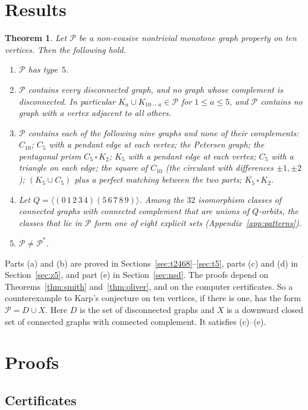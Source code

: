 \documentclass[11pt]{article}
\theoremstyle{plain}
\newtheorem{theorem}{Theorem}[section]
\theoremstyle{definition}
\theoremstyle{remark}
\newcommand{\PP}{\mathcal P}
\begin{document}
\section{Results}

\begin{theorem}\label{thm:main}
Let $\PP$ be a non-evasive nontrivial monotone graph property on ten vertices.
Then the following hold.
\begin{enumerate}[label=(\alph*)]
\item $\PP$ has type~$5$.
\item $\PP$ contains every disconnected graph, and no graph whose complement is disconnected.
In particular $K_a\cup K_{10-a}\in\PP$ for $1\le a\le5$, and $\PP$ contains no graph with a vertex adjacent to all others.
\item $\PP$ contains each of the following nine graphs and none of their complements:
$C_{10}$; $C_5$ with a pendant edge at each vertex; the Petersen graph; the pentagonal prism $C_5\,\square\,K_2$; $K_5$ with a pendant edge at each vertex; $C_5$ with a triangle on each edge; the square of $C_{10}$ (the circulant with differences $\pm1,\pm2$); $(K_5\cup C_5)$ plus a perfect matching between the two parts; $K_5\,\square\,K_2$.
\item Let $Q=\langle(0\,1\,2\,3\,4)(5\,6\,7\,8\,9)\rangle$.
Among the $32$ isomorphism classes of connected graphs with connected complement that are unions of $Q$-orbits, the classes that lie in $\PP$ form one of eight explicit sets (Appendix~\ref{app:patterns}).
\item $\PP\ne\PP^*$.
\end{enumerate}
\end{theorem}

Parts (a) and (b) are proved in Sections~\ref{sec:t2468}--\ref{sec:t5}, parts (c) and (d) in Section~\ref{sec:z5}, and part (e) in Section~\ref{sec:nsd}.
The proofs depend on Theorems~\ref{thm:smith} and~\ref{thm:oliver}, and on the computer certificates.
So a counterexample to Karp's conjecture on ten vertices, if there is one, has the form $\PP=D\cup X$.
Here $D$ is the set of disconnected graphs and $X$ is a downward closed set of connected graphs with connected complement.
It satisfies (c)--(e).

\section{Proofs}

\subsection{Certificates}\label{sec:cert}
\end{document}
